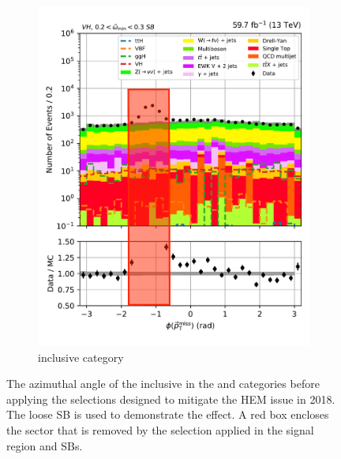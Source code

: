 \begin{figure}[htbp]
\begin{subfigure}[b]{0.4\textwidth}
        \includegraphics[width=\textwidth]{figures/hem_issue/sideband_4/met_phi/met_phi_VH_before_annotated.pdf}
        \caption{\VH inclusive category}
    \end{subfigure}
    \caption[The azimuthal angle of the \ptvecmiss inclusive in the \ttH and \VH categories before applying the selections designed to mitigate the HEM issue in 2018]{The azimuthal angle of the \ptvecmiss inclusive in the \ttH and \VH categories before applying the selections designed to mitigate the HEM issue in 2018. The loose \omegaTilde \gls{SB} is used to demonstrate the effect. A red box encloses the sector that is removed by the selection applied in the signal region and \glspl{SB}.}
    \label{fig:htoinv_hem_issue_met_phi}
\end{figure}
